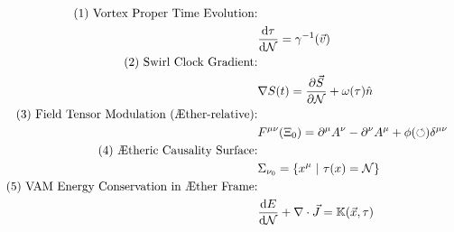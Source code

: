 \documentclass[a4paper,12pt]{article}
\begin{document}
    \begin{align}
        \text{(1) Vortex Proper Time Evolution:}\\
        \quad & \dv{\tau}{\mathcal{N}} = \gamma^{-1}(\vec{v}) \\
        \text{(2) Swirl Clock Gradient:}\\ \quad & \nabla S(t) = \frac{\partial \vec{S}}{\partial \mathcal{N}} + \omega(\tau) \hat{n} \\
        \text{(3) Field Tensor Modulation (Æther-relative):} \\\quad & F^{\mu\nu}(\Xi_0) = \partial^\mu A^\nu - \partial^\nu A^\mu + \phi(\circlearrowleft) \delta^{\mu\nu} \\
        \text{(4) Ætheric Causality Surface:}\\ \quad & \Sigma_{\nu_0} = \{ x^\mu \ | \ \tau(x) = \mathcal{N} \} \\
        \text{(5) VAM Energy Conservation in Æther Frame:}\\ \quad & \dv{E}{\mathcal{N}} + \nabla \cdot \vec{J} = \mathbb{K}(\vec{x}, \tau)
    \end{align}
\end{document}
